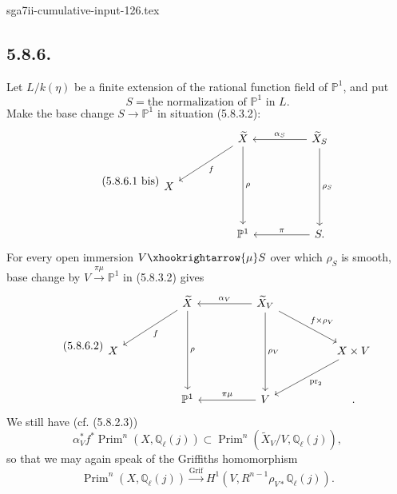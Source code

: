 \begin{filecontents*}{sga7ii-cumulative-input-126.tex}
\subsection*{5.8.6.}
Let $L/k(\eta)$ be a finite extension of the rational function field of
$\mathbb P^1$, and put
\begin{equation}\tag{5.8.6.1}
S=\text{the normalization of $\mathbb P^1$ in $L$}.
\end{equation}
Make the base change $S\to\mathbb P^1$ in situation (5.8.3.2):
\begin{equation}\tag{5.8.6.1 bis}
\begin{tikzcd}[column sep=huge,row sep=large]
{} & \widetilde X \arrow[dl,"f"] \arrow[dd,"\rho"]
& \widetilde X_S \arrow[l,"\alpha_S"'] \arrow[dd,"\rho_S"] \\
X&{}&{} \\
{} & \mathbb P^1 & S\arrow[l,"\pi"'] .
\end{tikzcd}
\end{equation}
For every open immersion $V\xhookrightarrow{\mu}S$ over which $\rho_S$
is smooth, base change by $V\xrightarrow{\pi\mu}\mathbb P^1$ in
(5.8.3.2) gives
\begin{equation}\tag{5.8.6.2}
\begin{tikzcd}[column sep=huge,row sep=large]
{} & \widetilde X \arrow[dl,"f"] \arrow[dd,"\rho"]
& \widetilde X_V \arrow[l,"\alpha_V"'] \arrow[dd,"\rho_V"]
  \arrow[dr,"f\times\rho_V"] &{} \\
X&{}&{}&X\times V\arrow[dl,"\operatorname{pr}_2"] \\
{} & \mathbb P^1 & V\arrow[l,"\pi\mu"'] &{} .
\end{tikzcd}
\end{equation}
We still have (cf. (5.8.2.3))
\begin{equation}\tag{5.8.6.3}
\alpha_V^*f^*\operatorname{Prim}^n(X,\mathbb Q_\ell(j))
\subset
\operatorname{Prim}^n(\widetilde X_V/V,\mathbb Q_\ell(j)),
\end{equation}
so that we may again speak of the Griffiths homomorphism
\begin{equation}\tag{5.8.6.4}
\operatorname{Prim}^n(X,\mathbb Q_\ell(j))
\xrightarrow{\operatorname{Grif}}
H^1(V,R^{n-1}\rho_{V*}\mathbb Q_\ell(j)).
\end{equation}


\end{filecontents*}
